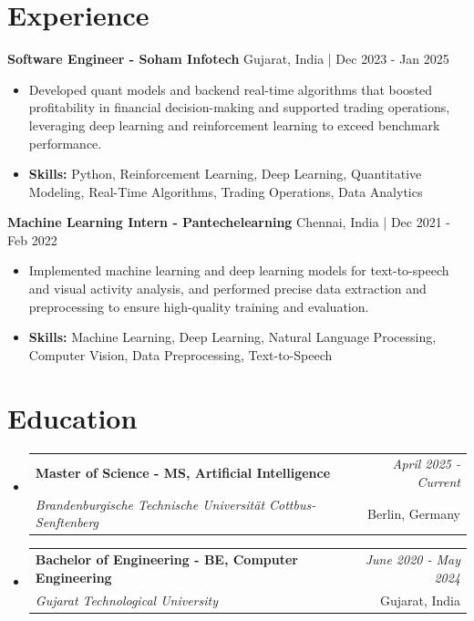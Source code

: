 \documentclass[a4paper,11pt]{article}
\makeatletter
\newcommand{\resumeSubheading}[4]{
\vspace{0.5mm}\item
    \begin{tabular*}{\linewidth}[t]{l@{\extracolsep{\fill}}r}
        \textbf{#1} & \textit{\footnotesize{#4}} \\
        \textit{\footnotesize{#3}} &  \footnotesize{#2}\\
    \end{tabular*}
    \vspace{-2.4mm}
}
\makeatother
\begin{document}
\section{\textbf{Experience}}


\vspace{1mm}
  \textbf{Software Engineer - Soham Infotech} \hfill Gujarat, India | Dec 2023 - Jan 2025
\vspace{-1.5mm} %
\begin{itemize}
  \item Developed quant models and backend real-time algorithms that boosted profitability in financial decision-making and supported trading operations, leveraging deep learning and reinforcement learning to exceed benchmark performance.

\vspace{-2mm}
  \item \textbf{Skills:} Python, Reinforcement Learning, Deep Learning, Quantitative Modeling, Real-Time Algorithms, Trading Operations, Data Analytics
\end{itemize}

\vspace{1mm}
  \textbf{Machine Learning Intern - Pantechelearning} \hfill Chennai, India | Dec 2021 - Feb 2022
\vspace{-1.5mm} %
\begin{itemize}
  \item Implemented machine learning and deep learning models for text-to-speech and visual activity analysis, and performed precise data extraction and preprocessing to ensure high-quality training and evaluation.
\vspace{-2mm}
  \item \textbf{Skills:} Machine Learning, Deep Learning, Natural Language Processing, Computer Vision, Data Preprocessing, Text-to-Speech
\end{itemize}\section{\textbf{Education}}
\vspace{-0.4mm}

\begin{itemize}[leftmargin=0.15in, label={}]
\resumeSubheading
{Master of Science - MS, Artificial Intelligence }{Berlin, Germany}
{Brandenburgische Technische Universität Cottbus-Senftenberg  }{April 2025 - Current}

\vspace{1.0mm} %
\resumeSubheading
{Bachelor of Engineering - BE, Computer Engineering  }{Gujarat, India}
{Gujarat Technological University }{June 2020 - May 2024}

\end{itemize}
\end{document}
